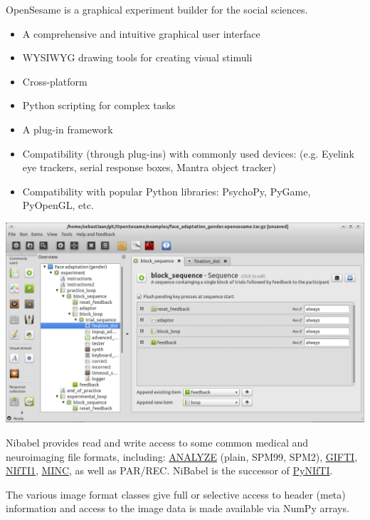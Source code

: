 \begin{multicols}{3}
OpenSesame is a graphical experiment builder for the social sciences.
\begin{itemize}[nolistsep,topsep=0em,leftmargin=1pc]
\item A comprehensive and intuitive graphical user interface
\item WYSIWYG drawing tools for creating visual stimuli
\item Cross-platform %
\item Python scripting for complex tasks
\item A plug-in framework
\item Compatibility (through plug-ins) with commonly used devices:
  (e.g. Eyelink eye trackers, serial response boxes, Mantra object tracker)
\item Compatibility with popular Python libraries:
  PsychoPy, PyGame, PyOpenGL, etc.
\end{itemize}
\includegraphics[width=\columnwidth]{../pics/opensesame_screenshot2.png}




Nibabel provides read and write access to some common medical and
neuroimaging file formats, including:
\href{http://www.grahamwideman.com/gw/brain/analyze/formatdoc.htm}{ANALYZE}
(plain, SPM99, SPM2),
\href{http://www.nitrc.org/projects/gifti}{GIFTI},
\href{http://nifti.nimh.nih.gov/nifti-1/}{NIfTI1},
\href{http://wiki.bic.mni.mcgill.ca/index.php/MINC}{MINC}, as well as
PAR/REC. NiBabel is the successor of
\href{http://niftilib.sourceforge.net/pynifti/}{PyNIfTI}.

The various image format classes give full or selective access to
header (meta) information and access to the image data is made
available via NumPy arrays.



\end{multicols}
